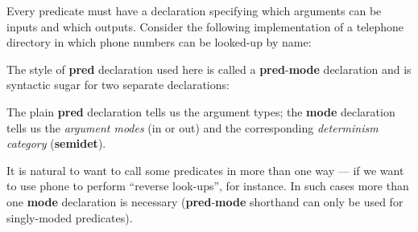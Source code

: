 \documentclass[a4paper,11pt,notitlepage,onecolumn]{book}
\begin{document}
Every predicate must have a declaration specifying which arguments can be
inputs and which outputs.  Consider the following implementation of a
telephone directory in which phone numbers can be looked-up by name:
\begin{small}

\begin{ptabular}
\nextline
\nextline
{}
\nextline
{}
\nextline
{}
\nextline
{}
\nextline
{}
\nextline
\end{ptabular}

\end{small}
The style of \textsf{\textbf{pred}} declaration used here is called a \textsf{\textbf{pred}}-\textsf{\textbf{mode}}
declaration and is syntactic sugar for two separate declarations:
\begin{small}

\begin{ptabular}
\nextline
{}
\nextline
\end{ptabular}

\end{small}
The plain \textsf{\textbf{pred}} declaration tells us the argument types; the \textsf{\textbf{mode}}
declaration tells us the \emph{argument modes} (\textsf{in} or \textsf{out}) and the
corresponding \emph{determinism category} (\textsf{\textbf{semidet}}).

It is natural to want to call some predicates in more than one way --- if we
want to use \textsf{phone} to perform ``reverse look-ups'', for instance.  In such
cases more than one \textsf{\textbf{mode}} declaration is necessary (\textsf{\textbf{pred}}-\textsf{\textbf{mode}} shorthand
can only be used for singly-moded predicates).
\end{document}
